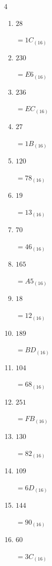 \begin{multicols}{4}
\begin{enumerate}
        $=E3_{(16)}$

  \item $28$

        $=1C_{(16)}$

  \item $230$

        $=E6_{(16)}$

  \item $236$

        $=EC_{(16)}$

  \item $27$

        $=1B_{(16)}$

\columnbreak %

  \item $120$

        $=78_{(16)}$

  \item $19$

        $=13_{(16)}$

  \item $70$

        $=46_{(16)}$

  \item $165$

        $=A5_{(16)}$

  \item $18$

        $=12_{(16)}$

  \item $189$

        $=BD_{(16)}$

  \item $104$

        $=68_{(16)}$

  \item $251$

        $=FB_{(16)}$

  \item $130$

        $=82_{(16)}$

  \item $109$

        $=6D_{(16)}$

  \item $144$

        $=90_{(16)}$

  \item $60$

        $=3C_{(16)}$


\end{enumerate}
\end{multicols}
